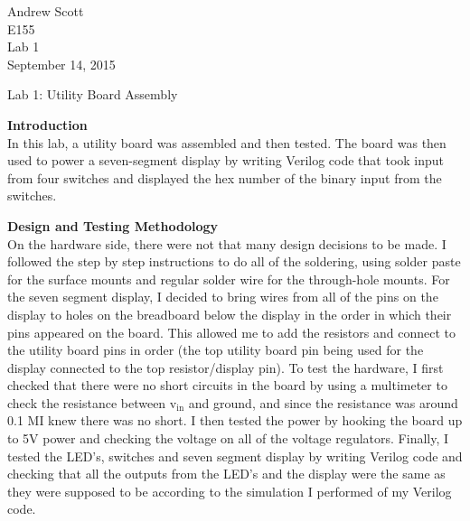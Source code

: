 \documentclass[11pt,letterpaper]{article}
\begin{document}
\begin{flushright}
Andrew Scott\\
E155\\
Lab 1\\
September 14, 2015
\end{flushright}

\begin{center}
Lab 1: Utility Board Assembly
\end{center}

\textbf{Introduction}\\
In this lab, a utility board was assembled and then tested. The board was then used to power a seven-segment display by writing Verilog code that took input from four switches and displayed the hex number of the binary input from the switches.

\textbf{Design and Testing Methodology}\\
On the hardware side, there were not that many design decisions to be made. I followed the step by step instructions to do all of the soldering, using solder paste for the surface mounts and regular solder wire for the through-hole mounts. For the seven segment display, I decided to bring wires from all of the pins on the display to holes on the breadboard below the display in the order in which their pins appeared on the board. This allowed me to add the resistors and connect to the utility board pins in order (the top utility board pin being used for the display connected to the top resistor/display pin). To test the hardware, I first checked that there were no short circuits in the board by using a multimeter to check the resistance between v$_{\text{in}}$ and ground, and since the resistance was around 0.1 M\ohm I knew there was no short. I then tested the power by hooking the board up to 5V power and checking the voltage on all of the voltage regulators. Finally, I tested the LED's, switches and seven segment display by writing Verilog code and checking that all the outputs from the LED's and the display were the same as they were supposed to be according to the simulation I performed of my Verilog code.
\end{document}
